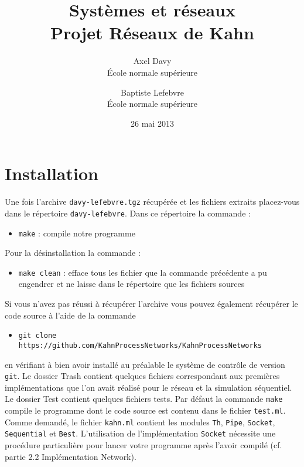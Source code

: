 \documentclass[a4paper]{article}
\begin{document}
	\title{\textbf{Systèmes et réseaux \\ Projet Réseaux de Kahn}}
	\author{Axel Davy \\ \'Ecole normale supérieure \and Baptiste Lefebvre \\ \'Ecole normale supérieure}
	\date{26 mai 2013}
	\maketitle


\section{Installation}

Une fois l'archive \verb!davy-lefebvre.tgz! récupérée et les fichiers extraits placez-vous dans le répertoire \verb!davy-lefebvre!. Dans ce répertoire la commande :
\begin{itemize}
	\item \verb!make! : compile notre programme
\end{itemize}
Pour la désinstallation la commande :
\begin{itemize}
	\item \verb!make clean! : efface tous les fichier que la commande précédente a pu engendrer et ne laisse dans le répertoire que les fichiers sources
\end{itemize}
Si vous n'avez pas réussi à récupérer l'archive vous pouvez également récupérer le code source à l'aide de la commande
\begin{itemize}
	\item \verb!git clone https://github.com/KahnProcessNetworks/KahnProcessNetworks!
\end{itemize}
en vérifiant à bien avoir installé au préalable le système de contrôle de version \verb!git!.
\newline
Le dossier Trash contient quelques fichiers correspondant aux premières
implémentations que l'on avait réalisé pour le réseau et la simulation séquentiel. 
\newline
Le dossier Test contient quelques fichiers tests. Par défaut la commande
\verb!make! compile le programme dont le code source est contenu dans le
fichier \verb!test.ml!.
\newline
Comme demandé, le fichier \verb!kahn.ml! contient les modules
\verb!Th!, \verb!Pipe!, \verb!Socket!, \verb!Sequential! et
\verb!Best!.
\newline
L'utilisation de l'implémentation \verb!Socket! nécessite une procédure
particulière pour lancer votre programme après l'avoir compilé (cf. partie
2.2 Implémentation Network).
\end{document}
